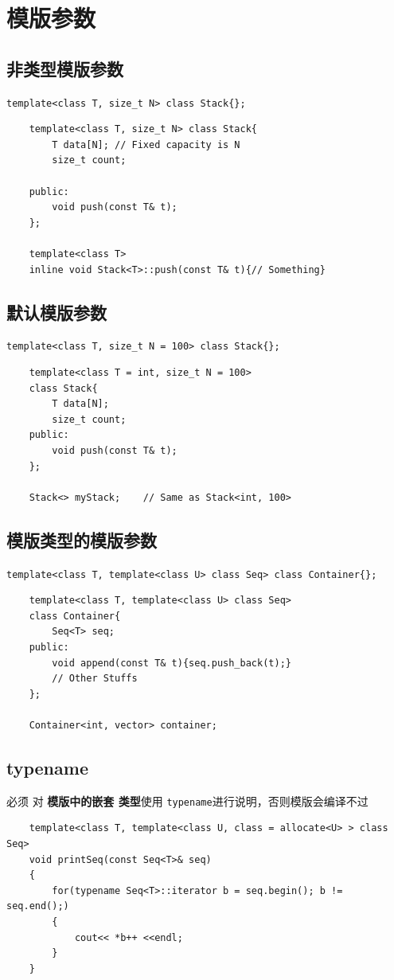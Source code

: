 \documentclass[UTF8,a4paper,12pt]{ctexbook}
\begin{document}
\section{模版参数}
	\subsection{非类型模版参数}
		\verb|template<class T, size_t N> class Stack{};|
	\begin{lstlisting}
	template<class T, size_t N> class Stack{
		T data[N]; // Fixed capacity is N
		size_t count;
		
	public:
		void push(const T& t);
	};
	
	template<class T>
	inline void Stack<T>::push(const T& t){// Something}
	\end{lstlisting}

	\subsection{默认模版参数}
		\verb|template<class T, size_t N = 100> class Stack{};|
	
		\begin{lstlisting}
	template<class T = int, size_t N = 100>
	class Stack{
		T data[N];
		size_t count;
	public:
		void push(const T& t);
	};
	
	Stack<> myStack; 	// Same as Stack<int, 100>
		\end{lstlisting}
	
	\subsection{模版类型的模版参数}
	\verb|template<class T, template<class U> class Seq> class Container{};|
	
	\begin{lstlisting}
	template<class T, template<class U> class Seq>
	class Container{
		Seq<T> seq;
	public:
		void append(const T& t){seq.push_back(t);}
		// Other Stuffs
	};
	
	Container<int, vector> container;
	\end{lstlisting}
	
	\subsection{typename}
	 必须 对 \textbf{模版中的嵌套 类型}使用 \verb|typename|进行说明，否则模版会编译不过
	\begin{lstlisting}
	template<class T, template<class U, class = allocate<U> > class Seq>
	void printSeq(const Seq<T>& seq)
	{
		for(typename Seq<T>::iterator b = seq.begin(); b != seq.end();)
		{
			cout<< *b++ <<endl;
		}
	}
	\end{lstlisting}
	
\end{document}
